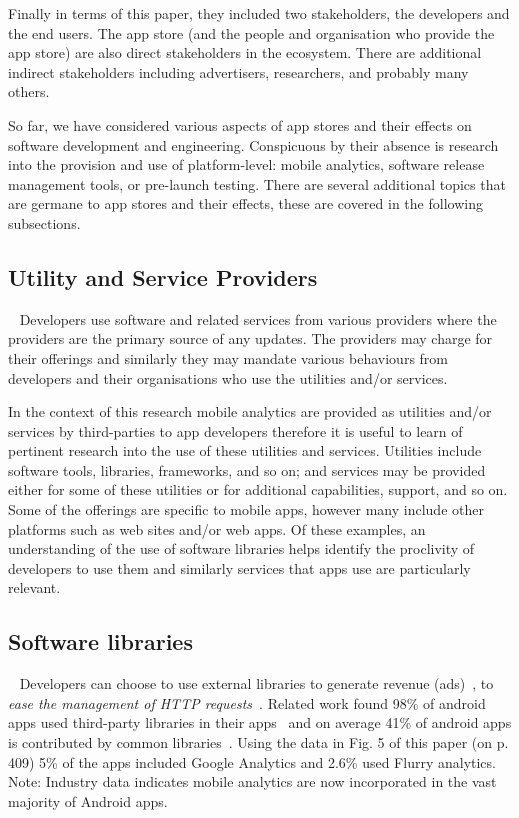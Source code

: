 Finally in terms of this paper, they included two stakeholders, the developers and the end users. The app store (and the people and organisation who provide the app store) are also direct stakeholders in the ecosystem. There are additional indirect stakeholders including advertisers, researchers, and probably many others. 

%
So far, we have considered various aspects of app stores and their effects on software development and engineering. Conspicuous by their absence is research into the provision and use of platform-level: mobile analytics, software release management tools, or pre-launch testing. There are several additional topics that are germane to app stores and their effects, these are covered in the following subsections.


\subsection{Utility and Service Providers}~\label{rw-utility-and-service-providers-topic}
Developers use software and related services from various providers where the providers are the primary source of any updates. The providers may charge for their offerings and similarly they may mandate various behaviours from developers and their organisations who use the utilities and/or services.

In the context of this research mobile analytics are provided as utilities and/or services by third-parties to app developers therefore it is useful to learn of pertinent research into the use of these utilities and services. Utilities include software tools, libraries, frameworks, and so on; and services may be provided either for some of these utilities or for additional capabilities, support, and so on. Some of the offerings are specific to mobile apps, however many include other platforms such as web sites and/or web apps. Of these examples, an understanding of the use of software libraries helps identify the proclivity of developers to use them and similarly services that apps use are particularly relevant.


\subsection{Software libraries}~\label{rw-software-libraries-topic}
Developers can choose to use external libraries to generate revenue (ads)~, to \emph{ease the management of HTTP requests}~. Related work found 98\% of android apps used third-party libraries in their apps~ and on average 41\% of android apps is contributed by common libraries~. Using the data in Fig. 5 of this paper (on p. 409) 5\% of the apps included Google Analytics and 2.6\% used Flurry analytics. Note: Industry data indicates mobile analytics are now incorporated in the vast majority of Android apps.  

